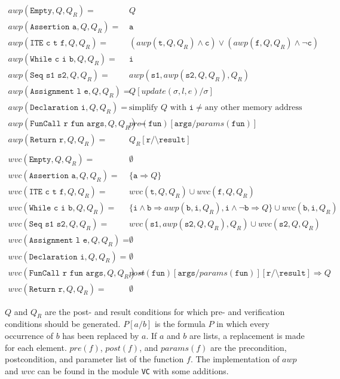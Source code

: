 \documentclass[12pt]{article}
\begin{document}
\begin{align*}
    awp(\texttt{Empty},Q,Q_{R})= & Q\\
    awp(\texttt{Assertion a},Q,Q_{R})= & \texttt{a}\\
    awp(\texttt{ITE c t f},Q,Q_{R})= & (awp(\texttt{t},Q,Q_{R})\wedge\texttt{c})\vee(awp(\texttt{f},Q,Q_{R})\wedge\lnot\texttt{c})\\
    awp(\texttt{While c i b},Q,Q_{R})= & \texttt{i}\\
    awp(\texttt{Seq s1 s2},Q,Q_{R})= & awp(\texttt{s1},awp(\texttt{s2},Q,Q_{R}),Q_{R})\\
    awp(\texttt{Assignment l e},Q,Q_{R})= & Q[update(\sigma,l,e)/\sigma]\\
    awp(\texttt{Declaration i},Q,Q_{R})= & \text{simplify }Q\text{ with }\texttt{i}\neq\text{any other memory address}\\
    awp(\texttt{FunCall r fun args},Q,Q_{R})= & pre(\texttt{fun})[\texttt{args}/params(\texttt{fun})]\\
    awp(\texttt{Return r},Q,Q_{R})= & Q_{R}[\texttt{r}/\texttt{\textbackslash result}]\\
    \\
    wvc(\texttt{Empty},Q,Q_{R})= & \emptyset\\
    wvc(\texttt{Assertion a},Q,Q_{R})= & \{\texttt{a}\Rightarrow Q\}\\
    wvc(\texttt{ITE c t f},Q,Q_{R})= & wvc(\texttt{t},Q,Q_{R})\cup wvc(\texttt{f},Q,Q_{R})\\
    wvc(\texttt{While c i b},Q,Q_{R})= & \{\texttt{i}\wedge\texttt{b}\Rightarrow awp(\texttt{b},\texttt{i},Q_{R}),\texttt{i}\wedge\lnot\texttt{b}\Rightarrow Q\}\cup wvc(\texttt{b},\texttt{i},Q_{R})\\
    wvc(\texttt{Seq s1 s2},Q,Q_{R})= & wvc(\texttt{s1},awp(\texttt{s2},Q,Q_{R}),Q_{R})\cup wvc(\texttt{s2},Q,Q_{R})\\
    wvc(\texttt{Assignment l e},Q,Q_{R})= & \emptyset\\
    wvc(\texttt{Declaration i},Q,Q_{R})= & \emptyset\\
    wvc(\texttt{FunCall r fun args},Q,Q_{R})= & post(\texttt{fun})[\texttt{args}/params(\texttt{fun})][\texttt{r}/\texttt{\textbackslash result}]\Rightarrow Q\\
    wvc(\texttt{Return r},Q,Q_{R})= & \emptyset
\end{align*}

$Q$ and $Q_R$ are the post- and result conditions for which pre- and verification conditions should be generated.
$P[a/b]$ is the formula $P$ in which every occurrence of $b$ has been replaced by $a$.
If $a$ and $b$ are lists, a replacement is made for each element.
$pre(f)$, $post(f)$, and $params(f)$ are the precondition, postcondition, and parameter list of the function $f$.
The implementation of $awp$ and $wvc$ can be found in the module \texttt{VC} with some additions.
\end{document}
